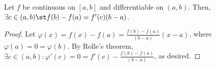 \begin{theorem}\label{thm:meanvalue}
    Let $f$ be continuous on $[a,b]$ and differentiable on $(a, b)$. Then, $\exists c \in (a, b) \st f(b) - f(a)=f'(c)(b-a)$.
\end{theorem}
\begin{proof}
    Let $\varphi(x) = f(x) - f(a) = \frac{f(b)-f(a)}{(b-a)}(x-a)$, where $\varphi(a) = 0 = \varphi(b)$. By Rolle's theorem, $\exists c \in (a, b) : \varphi'(c) = 0 = f'(c) - \frac{f(b)-f(a)}{(b-a)}$, as desired.
\end{proof}
